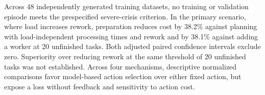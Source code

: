 Across 48 independently generated training datasets, no training or validation episode meets the prespecified severe-crisis criterion. In the primary scenario, where load increases rework, preparation reduces cost by 38.2\% against planning with load-independent processing times and rework and by 38.1\% against adding a worker at 20 unfinished tasks. Both adjusted paired confidence intervals exclude zero. Superiority over reducing rework at the same threshold of 20 unfinished tasks was not established. Across four mechanisms, descriptive normalized comparisons favor model-based action selection over either fixed action, but expose a loss without feedback and sensitivity to action cost.
